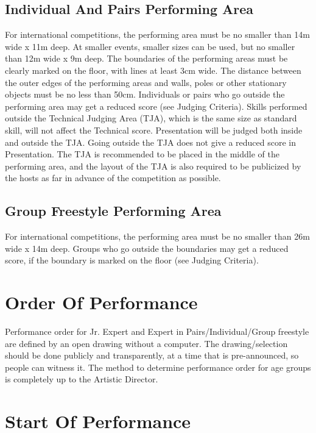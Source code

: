 \subsection{Individual And Pairs Performing Area}
For international competitions, the performing area must be no smaller than 14m wide x 11m deep.
At smaller events, smaller sizes can be used, but no smaller than 12m wide x 9m deep.
The boundaries of the performing areas must be clearly marked on the floor, with lines at least 3cm wide.
The distance between the outer edges of the performing areas and walls, poles or other stationary objects must be no less than 50cm.
Individuals or pairs who go outside the performing area may get a reduced score (see Judging Criteria).
Skills performed outside the Technical Judging Area (TJA), which is the same size as standard skill, will not affect the Technical score.
Presentation will be judged both inside and outside the TJA.
Going outside the TJA does not give a reduced score in Presentation.
The TJA is recommended to be placed in the middle of the performing area, and the layout of the TJA is also required to be publicized by the hosts as far in advance of the competition as possible.

\subsection{Group Freestyle Performing Area}
For international competitions, the performing area must be no smaller than 26m wide x 14m deep.
Groups who go outside the boundaries may get a reduced score, if the boundary is marked on the floor (see Judging Criteria).

\section{Order Of Performance}
Performance order for Jr. Expert and Expert in Pairs/Individual/Group freestyle are defined by an open drawing without a computer.
The drawing/selection should be done publicly and transparently, at a time that is pre-announced, so people can witness it.
The method to determine performance order for age groups is completely up to the Artistic Director.

\section{Start Of Performance}

